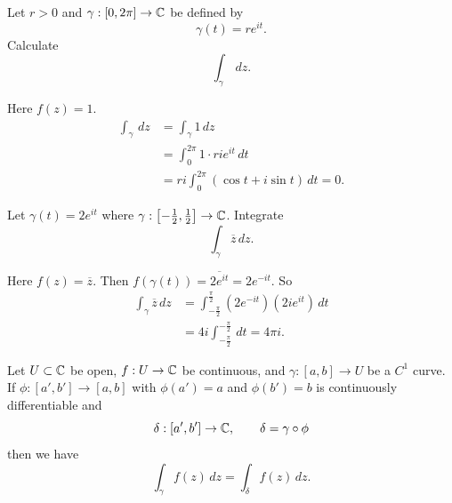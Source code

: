 \begin{example}
    Let $r > 0$ and $\gamma: [0, 2\pi] \to \mathbb{C}$ be defined by
    \[ \gamma(t) = re^{it}. \]
    Calculate
    \[ \int_\gamma \, dz. \]
\end{example}

\begin{solution}
    Here $f(z) = 1$.
    \begin{align*}
        \int_\gamma \, dz
        &= \int_\gamma 1 \, dz \\
        &= \int_0^{2\pi} 1 \cdot rie^{it} \, dt \\
        &= ri \int_0^{2\pi} (\cos{t} + i\sin{t}) \, dt = 0.
    \end{align*}
\end{solution}

\begin{example}
    Let $\gamma(t) = 2e^{it}$
    where $\gamma: \left[-\frac12, \frac12\right] \to \mathbb{C}$.
    Integrate
    \[ \int_\gamma \overline z \, dz. \]
\end{example}

\begin{solution}
    Here $f(z) = \overline z$.
    Then $f(\gamma(t)) = \overline{2e^{it}} = 2e^{-it}$.
    So
    \begin{align*}
        \int_\gamma \overline z \, dz 
        &= \int_{-\frac{\pi}2}^{\frac{\pi}2} \left(2e^{-it}\right) \left(2ie^{it}\right) \, dt \\
        &= 4i \int_{-\frac{\pi}2}^{-\frac{\pi}2} \, dt = 4\pi i.
    \end{align*}
\end{solution}

\begin{lemma}
    Let $U \subset \mathbb{C}$ be open,
    $f: U \to \mathbb{C}$ be continuous, and
    $\gamma: [a, b] \to U$ be a $C^1$ curve.
    If $\phi: [a', b'] \to [a, b]$ with 
    $\phi(a') = a$ and $\phi(b') = b$ is continuously differentiable and 
    \[ \delta: [a', b'] \to \mathbb{C}, \qquad \delta = \gamma \circ \phi \]
    then we have
    \[ \int_\gamma f(z) \, dz = \int_\delta f(z) \, dz. \]
\end{lemma}


